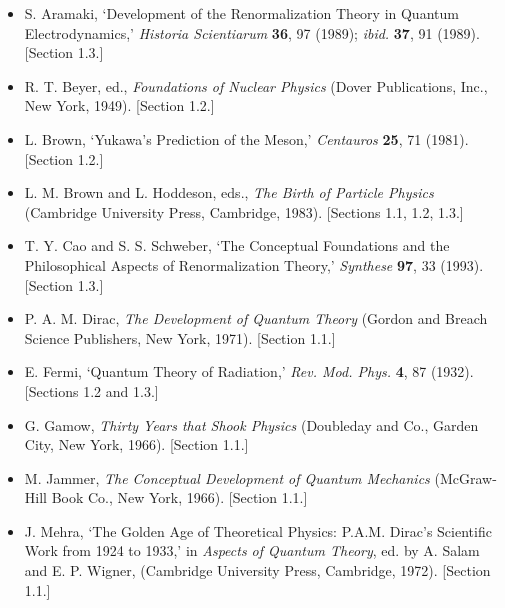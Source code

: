 

\begin{itemize}
\renewcommand{\labelitemi}{$\square$}
\item S. Aramaki, `Development of the Renormalization Theory in Quantum
Electrodynamics,' \emph{Historia Scientiarum} \textbf{36}, 97 (1989); \emph{ibid.}
\textbf{37}, 91 (1989). [Section 1.3.]

\item R. T. Beyer, ed., \emph{Foundations of Nuclear Physics} (Dover
Publications, Inc., New York, 1949). [Section 1.2.]

\item L. Brown, `Yukawa's Prediction of the Meson,' \emph{Centauros}
\textbf{25}, 71 (1981). [Section 1.2.]

\item L. M. Brown and L. Hoddeson, eds., \emph{The Birth of Particle Physics}
(Cambridge University Press, Cambridge, 1983). [Sections 1.1, 1.2, 1.3.]

\item T. Y. Cao and S. S. Schweber, `The Conceptual Foundations and the
Philosophical Aspects of Renormalization Theory,' \emph{Synthese} \textbf{97},
33 (1993). [Section 1.3.]

\item P. A. M. Dirac, \emph{The Development of Quantum Theory} (Gordon and
Breach Science Publishers, New York, 1971). [Section 1.1.]

\item E. Fermi, `Quantum Theory of Radiation,' \emph{Rev. Mod. Phys.}
\textbf{4}, 87 (1932). [Sections 1.2 and 1.3.]

\item G. Gamow, \emph{Thirty Years that Shook Physics} (Doubleday and Co.,
Garden City, New York, 1966). [Section 1.1.]

\item M. Jammer, \emph{The Conceptual Development of Quantum Mechanics}
(McGraw-Hill Book Co., New York, 1966). [Section 1.1.]

\item J. Mehra, `The Golden Age of Theoretical Physics: P.A.M. Dirac's
Scientific Work from 1924 to 1933,' in \emph{Aspects of Quantum Theory}, ed.
by A. Salam and E. P. Wigner, (Cambridge University Press, Cambridge, 1972).
[Section 1.1.]


\end{itemize}
